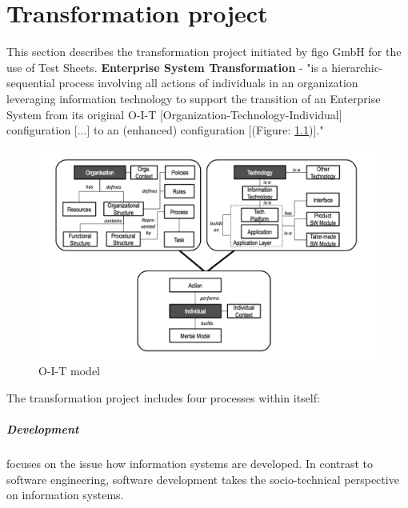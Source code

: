 
\chapter{Transformation project}
\label{sec:transP}
This section describes the transformation project initiated by figo GmbH for the use of Test Sheets.
\textbf{Enterprise System Transformation} -  "is a hierarchic-sequential process involving all actions of individuals in an organization leveraging information technology to support the transition of an Enterprise System from its original O-I-T [Organization-Technology-Individual] configuration [...] to an (enhanced) configuration [(Figure: \ref{fig:oit})]."\cite{MES5}

\begin{figure}[ht]
	\label{fig:oit}
	\centering
	\includegraphics[width=\textwidth]{grafiken/oit.png}
	\caption{O-I-T model\cite{MES5}}
\end{figure}

The transformation project includes four processes within itself:
\paragraph{Development} focuses on the issue how information systems are developed. In contrast to software engineering, software development takes the socio-technical perspective on information systems\cite{MES6}.


